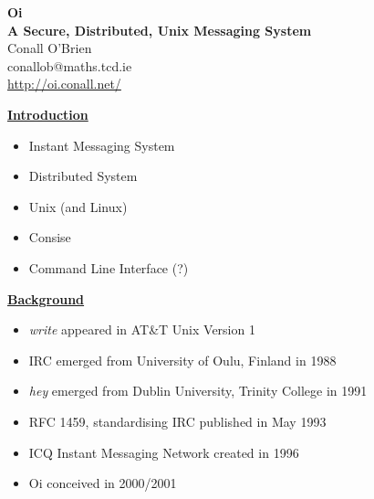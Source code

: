 \documentclass[a4,12pt]{seminar}
\newcommand{\SlideTitle}[1]{\Large \underline{\textbf{#1}}\normalsize}
\begin{document}
\pagestyle{fancy}

\begin{slide}

\begin{center}

\textbf{
Oi \\ A Secure, Distributed, Unix Messaging System \\ }
\vspace{20mm}
Conall O'Brien \\
\vspace{15mm}
\scriptsize{
conallob@maths.tcd.ie \\ 
\url{http://oi.conall.net/}
}

\end{center}

\end{slide}


\begin{slide}{\SlideTitle{Introduction}}

\begin{itemize}

\item Instant Messaging System

\item Distributed System

\item Unix (and Linux)

\item Consise

\item Command Line Interface (?)

\end{itemize} 

\vfill

\end{slide}


\begin{slide}{\SlideTitle{Background}}

\begin{itemize}

\item \emph{write} appeared in AT\&T Unix Version 1 

\item IRC emerged from University of Oulu, Finland in 1988

\item \emph{hey} emerged from Dublin University, Trinity College in 1991

\item RFC 1459, standardising IRC published in May 1993

\item ICQ Instant Messaging Network created in 1996

\item Oi conceived in 2000/2001

\end{itemize}

\vfill

\end{slide}
\end{document}
